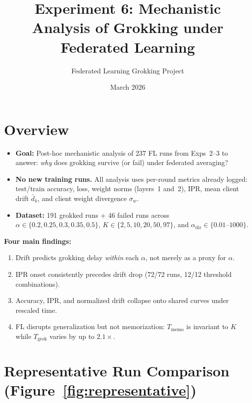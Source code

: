 \documentclass[11pt]{article}
\title{Experiment 6: Mechanistic Analysis of Grokking under Federated Learning}
\author{Federated Learning Grokking Project}
\date{March 2026}
\begin{document}
\maketitle

\section{Overview}
\label{sec:exp6-overview}

\begin{itemize}
  \item \textbf{Goal:} Post-hoc mechanistic analysis of 237 FL runs from
        Exps~2--3 to answer: \emph{why} does grokking survive (or fail)
        under federated averaging?
  \item \textbf{No new training runs.} All analysis uses per-round metrics
        already logged: test/train accuracy, loss, weight norms (layers~1
        and~2), IPR, mean client drift $\bar{d}_k$, and client weight
        divergence $\sigma_w$.
  \item \textbf{Dataset:} 191 grokked runs + 46 failed runs across
        $\alpha \in \{0.2, 0.25, 0.3, 0.35, 0.5\}$, $K \in \{2, 5, 10,
        20, 50, 97\}$, and $\alpha_{\mathrm{dir}} \in \{0.01\text{--}1000\}$.
\end{itemize}

\noindent\textbf{Four main findings:}
\begin{enumerate}[label=(\roman*)]
  \item Drift predicts grokking delay \emph{within} each $\alpha$, not
        merely as a proxy for $\alpha$.
  \item IPR onset consistently precedes drift drop (72/72 runs, 12/12
        threshold combinations).
  \item Accuracy, IPR, and normalized drift collapse onto shared curves
        under rescaled time.
  \item FL disrupts generalization but not memorization: $T_{\mathrm{memo}}$
        is invariant to $K$ while $T_{\mathrm{grok}}$ varies by up to
        $2.1\times$.
\end{enumerate}


\section{Representative Run Comparison (Figure~\ref{fig:representative})}
\label{sec:representative}
\end{document}
